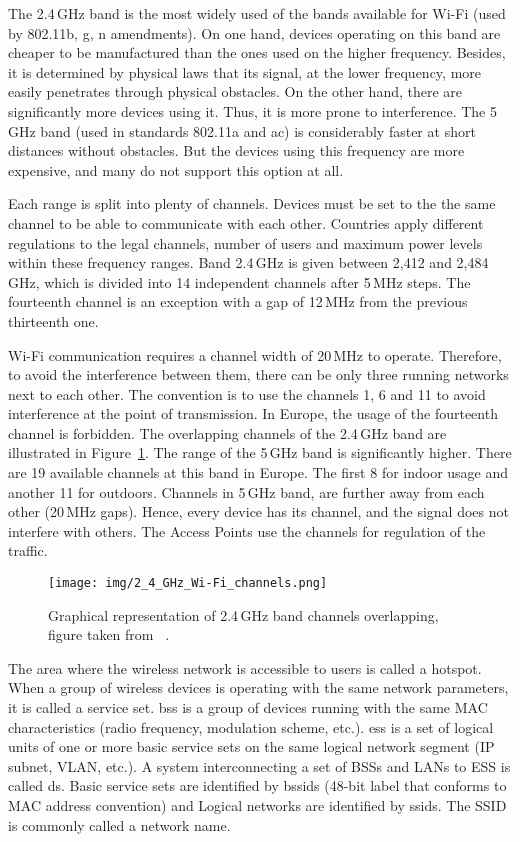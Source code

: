 The 2.4\,GHz band is the most widely used of the bands available for Wi-Fi (used by 802.11b, g, n amendments). On one hand, devices operating on this band are cheaper to be manufactured than the ones used on the higher frequency. Besides, it is determined by physical laws that its signal, at the lower frequency, more easily penetrates through physical obstacles. On the other hand, there are significantly more devices using it. Thus, it is more prone to interference. The 5\,GHz band (used in standards 802.11a and ac) is considerably faster at short distances without obstacles. But the devices using this frequency are more expensive, and many do not support this option at all.

Each range is split into plenty of channels. Devices must be set to the the same channel to be able to communicate with each other. Countries apply different regulations to the legal channels, number of users and maximum power levels within these frequency ranges. Band 2.4\,GHz is given between 2,412 and 2,484\,GHz, which is divided into 14 independent channels after 5\,MHz steps. The fourteenth channel is an exception with a gap of 12\,MHz from the previous thirteenth one.

Wi-Fi communication requires a channel width of 20\,MHz to operate. Therefore, to avoid the interference between them, there can be only three running networks next to each other. The convention is to use the channels 1, 6 and 11 to avoid interference at the point of transmission. In Europe, the usage of the fourteenth channel is forbidden. The overlapping channels of the 2.4\,GHz band are illustrated in Figure~\ref{fig:channels}. The range of the 5\,GHz band is significantly higher. There are 19 available channels at this band in Europe. The first 8 for indoor usage and another 11 for outdoors. Channels in 5\,GHz band, are further away from each other (20\,MHz gaps). Hence, every device has its channel, and the signal does not interfere with others. The Access Points use the channels for regulation of the traffic.

\begin{figure}[h!]
  \centering
  \texttt{[image: img/2\_4\_GHz\_Wi-Fi\_channels.png]}
  \caption[Graphical representation of 2.4\,GHz band channels overlapping]{Graphical representation of 2.4\,GHz band channels overlapping, figure taken from ~\cite{wi-finigel_2017}.}
  \label{fig:channels}
\end{figure}

The area where the wireless network is accessible to users is called a hotspot. When a group of wireless devices is operating with the same network parameters, it is called a service set. \gls{bss} is a group of devices running with the same MAC characteristics (radio frequency, modulation scheme, etc.). \gls{ess} is a set of logical units of one or more basic service sets on the same logical network segment (IP subnet, VLAN, etc.). A system interconnecting a set of BSSs and LANs to ESS is called \gls{ds}. Basic service sets are identified by \glspl{bssid} (48-bit label that conforms to MAC address convention) and Logical networks are identified by \glspl{ssid}. The SSID is commonly called a network name.

